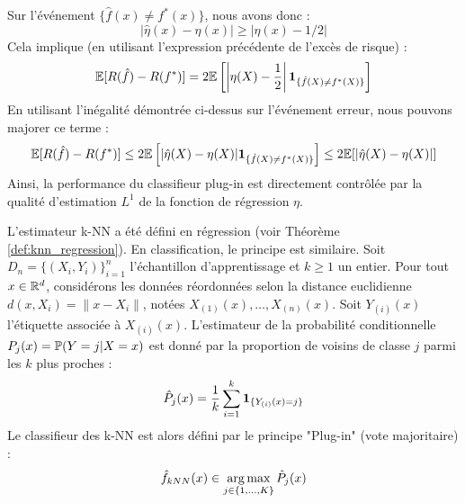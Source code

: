 \begin{center}
\end{center}
Sur l'événement $\{\hat{f}(x) \neq f^*(x)\}$, nous avons donc :
\[
|\hat{\eta}(x) - \eta(x)| \ge |\eta(x) - 1/2|
\]
Cela implique (en utilisant l'expression précédente de l'excès de risque) :
\[
\mathbb{E}[R(\hat{f}) - R(f^*)] = 2\mathbb{E}\left[ \left| \eta(X) - \frac{1}{2} \right| \mathbf{1}_{\{\hat{f}(X) \neq f^*(X)\}} \right]
\]
En utilisant l'inégalité démontrée ci-dessus sur l'événement erreur, nous pouvons majorer ce terme :
\[
\mathbb{E}[R(\hat{f}) - R(f^*)] \le 2\mathbb{E}\left[ |\hat{\eta}(X) - \eta(X)| \mathbf{1}_{\{\hat{f}(X) \neq f^*(X)\}} \right] \le 2\mathbb{E}[|\hat{\eta}(X) - \eta(X)|]
\]
Ainsi, la performance du classifieur plug-in est directement contrôlée par la qualité d'estimation $L^1$ de la fonction de régression $\eta$.

\begin{definition}
L'estimateur k-NN a été défini en régression (voir Théorème \ref{def:knn_regression}). En classification, le principe est similaire.
Soit $D_n = \{(X_i, Y_i)\}_{i=1}^n$ l'échantillon d'apprentissage et $k \ge 1$ un entier.
Pour tout $x \in \mathbb{R}^d$, considérons les données réordonnées selon la distance euclidienne $d(x,X_i) = \|x-X_i\|$, notées $X_{(1)}(x), \dots, X_{(n)}(x)$.
Soit $Y_{(i)}(x)$ l'étiquette associée à $X_{(i)}(x)$.
L'estimateur de la probabilité conditionnelle $P_j(x) = \mathbb{P}(Y=j|X=x)$ est donné par la proportion de voisins de classe $j$ parmi les $k$ plus proches :
\[
\hat{P}_j(x) = \frac{1}{k} \sum_{i=1}^k \mathbf{1}_{\{Y_{(i)}(x) = j\}}
\]
Le classifieur des k-NN est alors défini par le principe "Plug-in" (vote majoritaire) :
\[
\hat{f}_{kNN}(x) \in \operatorname*{arg\,max}_{j \in \{1,\dots,K\}} \hat{P}_j(x)
\]
\end{definition}

